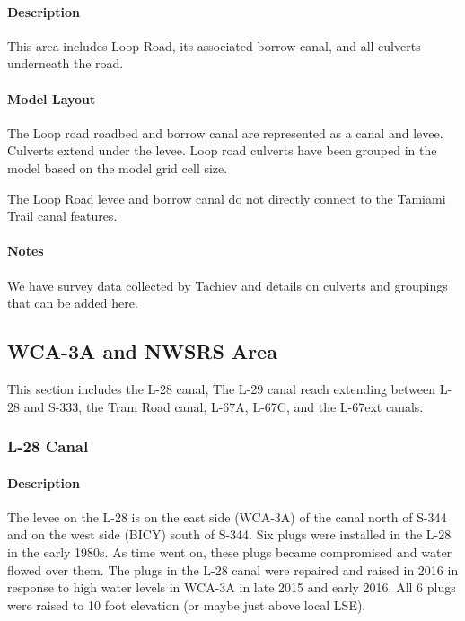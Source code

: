 \paragraph{Description}
This area includes Loop Road, its associated borrow canal, and all culverts underneath the road.

\paragraph{Model Layout}
The Loop road roadbed and borrow canal are represented as a canal and levee. Culverts extend under the levee.
Loop road culverts have been grouped in the model based on the model grid cell size.

The Loop Road levee and borrow canal do not directly connect to the Tamiami Trail canal features.

\begin{notes}
\paragraph{Notes}
We have survey data collected by Tachiev and details on culverts and groupings that can be added here.
\end{notes}

\clearpage


\subsection{WCA-3A and NWSRS Area}
This section includes the L-28 canal, The L-29 canal reach extending between L-28 and S-333, the Tram Road canal, L-67A, L-67C, and the L-67ext canals.
\subsubsection{L-28 Canal}

\paragraph{Description}
The levee on the L-28 is on the east side (WCA-3A) of the canal north of S-344 and on the west side (BICY) south of S-344.
Six plugs were installed in the L-28 in the early 1980s. As time went on, these plugs became compromised and water flowed over them.  The plugs in the L-28 canal were repaired and raised in 2016 in response to high water levels in WCA-3A in late 2015 and early 2016.  All 6 plugs were raised to 10 foot elevation \citep{ USACE2016TempDev} (or maybe just above local LSE).

